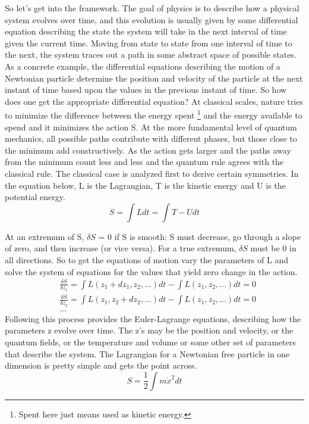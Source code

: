 So let's get into the framework. The goal of physics is to describe how a physical system evolves over time, and this evolution is usually given by some differential equation describing the state the system will take in the next interval of time given the current time. Moving from state to state from one interval of time to the next, the system traces out a path in some abstract space of possible states. As a concrete example, the differential equations describing the motion of a Newtonian particle determine the position and velocity of the particle at the next instant of time based upon the values in the previous instant of time. So how does one get the appropriate differential equation? At classical scales, nature tries to minimize the difference between the energy spent \footnote{Spent here just means used as kinetic energy.} and the energy available to spend and it minimizes the action S. At the more fundamental level of quantum mechanics, all possible paths contribute with different phases, but those close to the minimum add constructively. As the action gets larger and the paths away from the minimum count less and less and the quantum rule agrees with the classical rule. The classical case is analyzed first to derive certain symmetries. In the equation below, L is the Lagrangian, T is the kinetic energy and U is the potential energy.     
\begin{equation}
S = \int L dt = \int T - U dt
\end{equation}

At an extremum of S, $\delta S$ = 0 if S is smooth: S must decrease, go through a slope of zero, and then increase (or vice versa). For a true extremum, $\delta S$ must be 0 in all directions. So to get the equations of motion vary the parameters of L and solve the system of equations for the values that yield zero change in the action.
\begin{equation}
\begin{split}
&\frac{\delta S}{\delta z_1} = \int L(z_1 + dz_1, z_2, ...)dt - \int L(z_1, z_2, ...)dt = 0 \\
&\frac{\delta S}{\delta z_2} = \int L(z_1, z_2 + dz_2, ...)dt - \int L(z_1, z_2, ...)dt = 0 \\
&...
\end{split}
\end{equation}
Following this process provides the Euler-Lagrange equations, describing how the parameters z evolve over time. The z's may be the position and velocity, or the quantum fields, or the temperature and volume or some other set of parameters that describe the system. The Lagrangian for a Newtonian free particle in one dimension is pretty simple and gets the point across. 
\begin{equation}
S = \frac{1}{2} \int m\dot{x}^2 dt
\end{equation}

